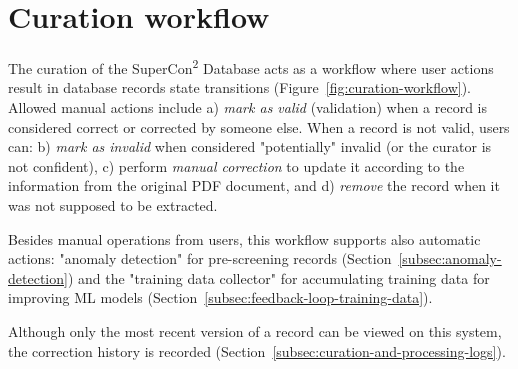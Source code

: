 \documentclass[]{interact}
\theoremstyle{plain} %
\theoremstyle{definition}
\theoremstyle{remark}
\begin{document}

\section{Curation workflow}
\label{sec:curation-workflow}
The curation of the SuperCon\textsuperscript{2} Database acts as a workflow where user actions result in database records state transitions (Figure~\ref{fig:curation-workflow}). 
Allowed manual actions include a) \textit{mark as valid} (validation) when a record is considered correct or corrected by someone else. When a record is not valid, users can: b) \textit{mark as invalid} when considered "potentially" invalid (or the curator is not confident), c) perform \textit{manual correction} to update it according to the information from the original PDF document, and d) \textit{remove} the record when it was not supposed to be extracted.

Besides manual operations from users, this workflow supports also automatic actions: "anomaly detection" for pre-screening records (Section~\ref{subsec:anomaly-detection}) and the "training data collector" for accumulating training data for improving ML models (Section~\ref{subsec:feedback-loop-training-data}). 


Although only the most recent version of a record can be viewed on this system, the correction history is recorded (Section~\ref{subsec:curation-and-processing-logs}). 
\end{document}
